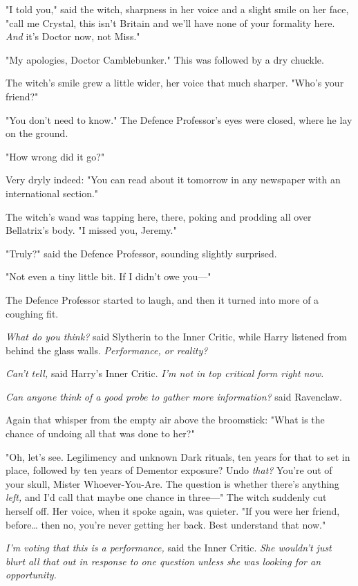 "I told you," said the witch, sharpness in her voice and a slight smile on her
face, "call me Crystal, this isn't Britain and we'll have none of your
formality here. \emph{And} it's Doctor now, not Miss."

"My apologies, Doctor Camblebunker." This was followed by a dry chuckle.

The witch's smile grew a little wider, her voice that much sharper. "Who's your
friend?"

"You don't need to know." The Defence Professor's eyes were closed, where he
lay on the ground.

"How wrong did it go?"

Very dryly indeed: "You can read about it tomorrow in any newspaper with an
international section."

The witch's wand was tapping here, there, poking and prodding all over
Bellatrix's body. "I missed you, Jeremy."

"Truly?" said the Defence Professor, sounding slightly surprised.

"Not even a tiny little bit. If I didn't owe you---"

The Defence Professor started to laugh, and then it turned into more of a
coughing fit.

\emph{What do you think?} said Slytherin to the Inner Critic, while Harry
listened from behind the glass walls. \emph{Performance, or reality?}

\emph{Can't tell,} said Harry's Inner Critic. \emph{I'm not in top critical
form right now.}

\emph{Can anyone think of a good probe to gather more information?} said
Ravenclaw.

Again that whisper from the empty air above the broomstick: "What is the chance
of undoing all that was done to her?"

"Oh, let's see. Legilimency and unknown Dark rituals, ten years for that to set
in place, followed by ten years of Dementor exposure? Undo \emph{that?} You're
out of your skull, Mister Whoever-You-Are. The question is whether there's
anything \emph{left,} and I'd call that maybe one chance in three---" The witch
suddenly cut herself off. Her voice, when it spoke again, was quieter. "If you
were her friend, before{\ldots} then no, you're never getting her back. Best
understand that now."

\emph{I'm voting that this is a performance,} said the Inner Critic. \emph{She
wouldn't just blurt all that out in response to one question unless she was
looking for an opportunity.}

